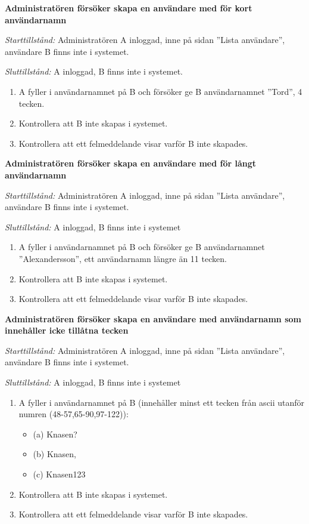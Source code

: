 \documentclass[a4paper]{article}
\begin{document}
\begin{FT}
\item
\textbf{Administratören försöker skapa en användare med för kort användarnamn}

\emph{Starttillstånd:} Administratören A inloggad, inne på sidan ''Lista användare'', användare B finns inte i systemet.

\emph{Sluttillstånd:} A inloggad, B finns inte i systemet.

\begin{enumerate}
\item A fyller i användarnamnet på B och försöker ge B användarnamnet ''Tord'', 4 tecken.
\item Kontrollera att B inte skapas i systemet.
\item Kontrollera att ett felmeddelande visar varför B inte skapades.
\end{enumerate}

\item
\textbf{Administratören försöker skapa en användare med för långt användarnamn}

\emph{Starttillstånd:} Administratören A inloggad, inne på sidan ''Lista användare'', användare B finns inte i systemet.

\emph{Sluttillstånd:} A inloggad, B finns inte i systemet

\begin{enumerate}
\item A fyller i användarnamnet på B och försöker ge B användarnamnet ''Alexandersson'', ett användarnamn längre än 11 tecken.
\item Kontrollera att B inte skapas i systemet.
\item Kontrollera att ett felmeddelande visar varför B inte skapades.
\end{enumerate}

\item
\textbf{Administratören försöker skapa en användare med användarnamn som innehåller icke tillåtna tecken}

\emph{Starttillstånd:} Administratören A inloggad, inne på sidan ''Lista användare'', användare B finns inte i systemet.

\emph{Sluttillstånd:} A inloggad, B finns inte i systemet

\begin{enumerate}
\item A fyller i användarnamnet på B (innehåller minst ett tecken från ascii utanför numren (48-57,65-90,97-122)):
\begin{itemize}
\item [] (a) Knasen? %
\item [] (b) Knasen,
\item [] (c) Knasen123
\end{itemize}
\item Kontrollera att B inte skapas i systemet.
\item Kontrollera att ett felmeddelande visar varför B inte skapades.
\end{enumerate}


\end{FT}
\end{document}
